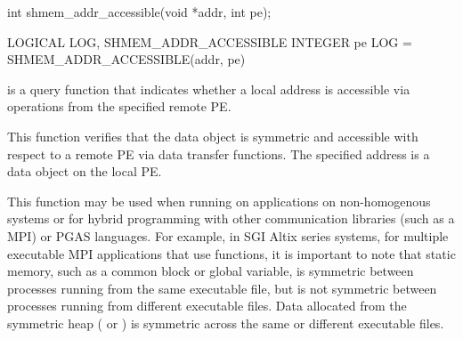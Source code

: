 \synC
int shmem_addr_accessible(void *addr, int pe);

\synF
LOGICAL LOG, SHMEM_ADDR_ACCESSIBLE
INTEGER pe
LOG = SHMEM_ADDR_ACCESSIBLE(addr, pe)


{
         is  a  query  function  that indicates whether a
       local address is accessible via \openshmem operations  from the  specified
       remote \ac{PE}. 
       
       This function verifies that the data object is symmetric and accessible
       with respect to a remote \ac{PE} via \openshmem  data  transfer  functions.   The
       specified address  is a data object on the local \ac{PE}. 
       
       This function may be used when running on \openshmem applications on non-homogenous systems or for hybrid programming
       with other communication libraries (such as a \ac{MPI}) or \ac{PGAS} languages. 
       For example, in  SGI Altix series systems, for multiple executable MPI applications
       that use \openshmem functions, it is important to note that  static  memory,
       such  as a  \Fortran{}  common  block  or \Clang{} global variable, is symmetric
       between processes running from the same executable  file,  but  is  not
       symmetric  between  processes  running from different executable files.
       Data allocated from  the symmetric  heap  ( or	)  is
       symmetric across the same or different executable files.
}
{
}
\eAPI
